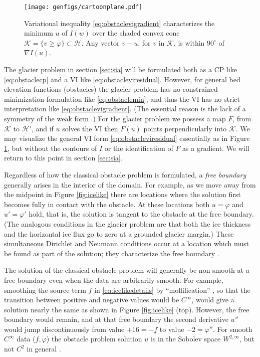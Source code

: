 \documentclass[letterpaper,final,12pt,reqno]{amsart}
\theoremstyle{claim}
\newcommand{\grad}{\nabla}
\numberwithin{equation}{section}
\numberwithin{figure}{section}
\numberwithin{table}{section}
\numberwithin{theorem}{section}
\begin{document}
\begin{figure}
\texttt{[image: genfigs/cartoonplane.pdf]}
\caption{Variational inequality \eqref{eq:obstaclevigradient} characterizes the minimum $u$ of $I(w)$ over the shaded convex cone $\mathcal{K}=\{v\ge \varphi\} \subset \mathcal{H}$.  Any vector $v-u$, for $v$ in $\mathcal{K}$, is within $90^\circ$ of $\grad I(u)$.}
\label{fig:cartoonplane}
\end{figure}

The glacier problem in section \ref{sec:sia} will be formulated both as a CP like \eqref{eq:obstaclecp} and a VI like \eqref{eq:obstacleviresidual}.  However, for general bed elevation functions (obstacles) the glacier problem has no constrained minimization formulation like \eqref{eq:obstaclemin}, and thus the VI has no strict interpretation like \eqref{eq:obstaclevigradient}.  (The essential reason is the lack of a symmetry of the weak form \cite{JouvetBueler2012}.)  For the glacier problem we possess a map $F$, from $\mathcal{K}$ to $\mathcal{H}'$, and if $u$ solves the VI then $F(u)$ points perpendicularly into $\mathcal{K}$.  We may visualize the general VI form \eqref{eq:obstacleviresidual} essentially as in Figure \ref{fig:cartoonplane}, but without the contours of $I$ or the identification of $F$ as a gradient.  We will return to this point in section \ref{sec:sia}.

Regardless of how the classical obstacle problem is formulated, a \emph{free boundary} generally arises in the interior of the domain.  For example, as we move away from the midpoint in Figure \ref{fig:icelike} there are locations where the solution first becomes fully in contact with the obstacle.  At these locations both $u=\varphi$ and $u'=\varphi'$ hold, that is, the solution is tangent to the obstacle at the free boundary.  (The analogous conditions in the glacier problem are that both the ice thickness and the horizontal ice flux go to zero at a grounded glacier margin.)  These simultaneous Dirichlet and Neumann conditions occur at a location which must be found as part of the solution; they characterize the free boundary \cite[Chapter V]{KinderlehrerStampacchia1980}.

The solution of the classical obstacle problem will generally be non-smooth at a free boundary even when the data are arbitrarily smooth.  For example, smoothing the source term $f$ in \eqref{eq:icelikedetails} by ``mollification'' \cite{Evans2010}, so that the transition between positive and negative values would be $C^\infty$, would give a solution nearly the same as shown in Figure \ref{fig:icelike} (top).  However, the free boundary would remain, and at that free boundary the second derivative $u''$ would jump discontinuously from value $+16=-f$ to value $-2=\varphi''$.  For smooth $C^\infty$ data ($f,\varphi$) the obstacle problem solution $u$ is in the Sobolev space $W^{2,\infty}$, but not $C^2$ in general \cite[section IV.6]{KinderlehrerStampacchia1980}.
\end{document}
